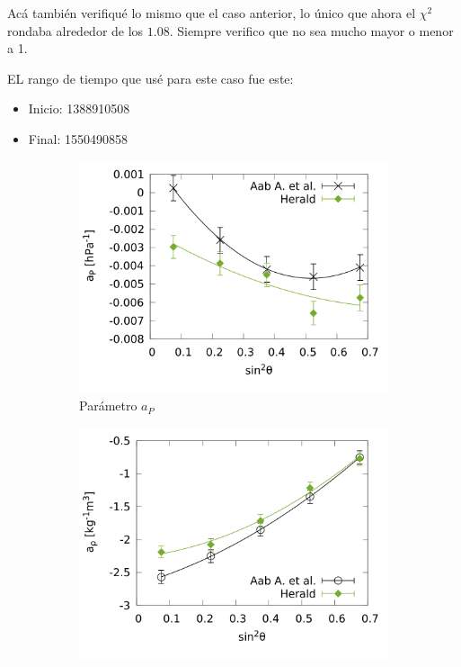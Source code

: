 			Acá también verifiqué lo mismo que el caso anterior, lo único que ahora el $\chi^2$ rondaba alrededor de los $1.08$. Siempre verifico que no sea mucho mayor o menor a 1.

			EL rango de tiempo que usé para este caso fue este: 
			\begin{itemize}
				\item Inicio: 1388910508
				\item Final: 1550490858
			\end{itemize}
			
				\begin{figure}[H]
					\begin{subfigure}[b]{0.5\textwidth}
					\includegraphics[width=\linewidth]{../Anisotropia/params/ap_2020_above_1EeV.png}
					\caption{Parámetro $a_P$ }
					\label{fig:ap_2020_1EeV}
					\end{subfigure}%
					\hspace{\fill}
					\begin{subfigure}[b]{0.5\textwidth}
					\includegraphics[width=\linewidth]{../Anisotropia/params/arho_2020_above_1EeV.png}

\end{subfigure}
\end{figure}
